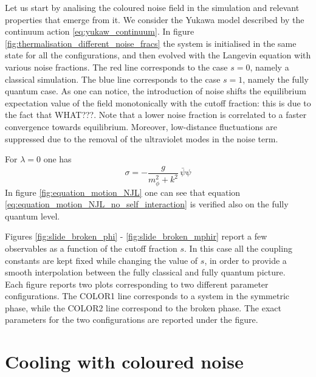 Let us start by analising the coloured noise field in the simulation and relevant properties that emerge from it. We consider the Yukawa model described by the continuum action \ref{eq:yukaw_continuum}.
In figure \ref{fig:thermalisation_different_noise_fracs} the system is initialised in the same state for all the configurations, and then evolved with the Langevin equation with various noise fractions. The red line corresponds to the case $s=0$, namely a classical simulation. The blue line corresponds to the case $s=1$, namely the fully quantum case. As one can notice, the introduction of noise shifts the equilibrium expectation value of the field monotonically with the cutoff fraction: this is due to the fact that WHAT???. Note that a lower noise fraction is correlated to a faster convergence towards equilibrium. Moreover, low-distance fluctuations are suppressed due to the removal of the ultraviolet modes in the noise term.

For $\lambda = 0$ one has
\begin{equation}
    \sigma = -\frac{g}{m_\phi^2 + k^2} \, \bar\psi \psi
    \label{eq:equation_motion_NJL_no_self_interaction}
\end{equation}
In figure \ref{fig:equation_motion_NJL} one can see that equation \eqref{eq:equation_motion_NJL_no_self_interaction} is verified also on the fully quantum level.

Figures \ref{fig:slide_broken_phi} - \ref{fig:slide_broken_mphir} report a few observables as a function of the cutoff fraction $s$. In this case all the coupling constants are kept fixed while changing the value of $s$, in order to provide a smooth interpolation between the fully classical and fully quantum picture. \\
Each figure reports two plots corresponding to two different parameter configurations. The COLOR1 line corresponds to a system in the symmetric phase, while the COLOR2 line correspond to the broken phase. The exact parameters for the two configurations are reported under the figure.

\newpage

\section{Cooling with coloured noise}

